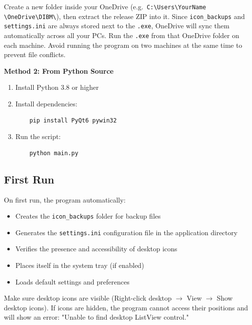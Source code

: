\documentclass[a4paper,11pt]{article}
\begin{document}
\begin{infobox}
  Create a new folder inside your OneDrive
  (e.g.\ \texttt{C:\textbackslash{}Users\textbackslash{}YourName%
  \textbackslash{}OneDrive\textbackslash{}DIBM\textbackslash{}}),
  then extract the release ZIP into it.
  Since \texttt{icon\_backups} and \texttt{settings.ini} are always
  stored next to the \texttt{.exe}, OneDrive will sync them
  automatically across all your PCs.  Run the \texttt{.exe} from
  that OneDrive folder on each machine.  Avoid running the program
  on two machines at the same time to prevent file conflicts.
\end{infobox}

\textbf{Method 2: From Python Source}
\begin{enumerate}
  \item Install Python 3.8 or higher
  \item Install dependencies:
    \begin{verbatim}
    pip install PyQt6 pywin32
    \end{verbatim}
  \item Run the script:
    \begin{verbatim}
    python main.py
    \end{verbatim}
\end{enumerate}

\subsection{First Run}

On first run, the program automatically:
\begin{itemize}
  \item Creates the \texttt{icon\_backups} folder for backup files
  \item Generates the \texttt{settings.ini} configuration file in the
    application directory
  \item Verifies the presence and accessibility of desktop icons
  \item Places itself in the system tray (if enabled)
  \item Loads default settings and preferences
\end{itemize}

\begin{warningbox}
  Make sure desktop icons are visible (Right-click desktop
  $\rightarrow$ View $\rightarrow$ Show desktop icons). If icons are
  hidden, the program cannot access their positions and will show an
  error: "Unable to find desktop ListView control."
\end{warningbox}
\end{document}
